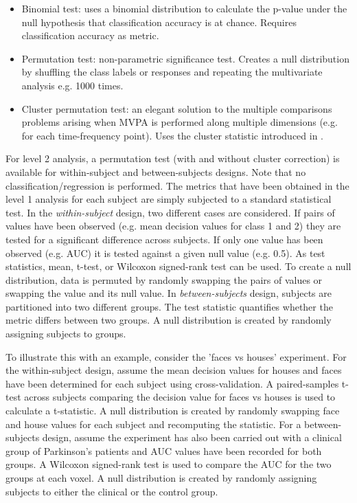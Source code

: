 \documentclass[utf8]{frontiersSCNS} %
\begin{document}
\begin{itemize}
    \item Binomial test: uses a binomial distribution to calculate the p-value under the null hypothesis that classification accuracy is at chance. Requires classification accuracy as metric.
    \item Permutation test: non-parametric significance test. Creates a null distribution by shuffling the class labels or responses and repeating the multivariate analysis e.g. 1000 times.
    \item Cluster permutation test: an elegant solution to the multiple comparisons problems arising when MVPA is performed along multiple dimensions (e.g. for each time-frequency point). Uses the cluster statistic introduced in
    \cite{Maris2007}.
\end{itemize}

For level 2 analysis, a permutation test (with and without cluster correction) is available for within-subject and between-subjects designs. Note that no classification/regression is performed. The metrics that have been obtained in the level 1 analysis for each subject are simply subjected to a standard statistical test. In the \textit{within-subject} design, two different cases are considered. If pairs of values have been observed (e.g. mean decision values for class 1 and 2) they are tested for a significant difference across subjects. If only one value has been observed (e.g. AUC) it is tested against a given null value (e.g. 0.5). As test statistics, mean, t-test, or Wilcoxon signed-rank test can be used. To create a null distribution, data is permuted by randomly swapping the pairs of values or swapping the value and its null value. In \textit{between-subjects} design, subjects are partitioned into two different groups. The test statistic quantifies whether the metric differs between two groups. A null distribution is created by randomly assigning subjects to groups.

To illustrate this with an example, consider the 'faces vs houses' experiment. For the within-subject design, assume the mean decision values for houses and faces have been determined for each subject using cross-validation. A paired-samples t-test across subjects comparing the decision value for faces vs houses is used to calculate a t-statistic. A null distribution is created by randomly swapping face and house values for each subject and recomputing the statistic. For a between-subjects design, assume the experiment has also been carried out with a clinical group of Parkinson's patients and AUC values have been recorded for both groups. A Wilcoxon signed-rank test is used to compare the AUC for the two groups at each voxel. A null distribution is created by randomly assigning subjects to either the clinical or the control group.
\end{document}
